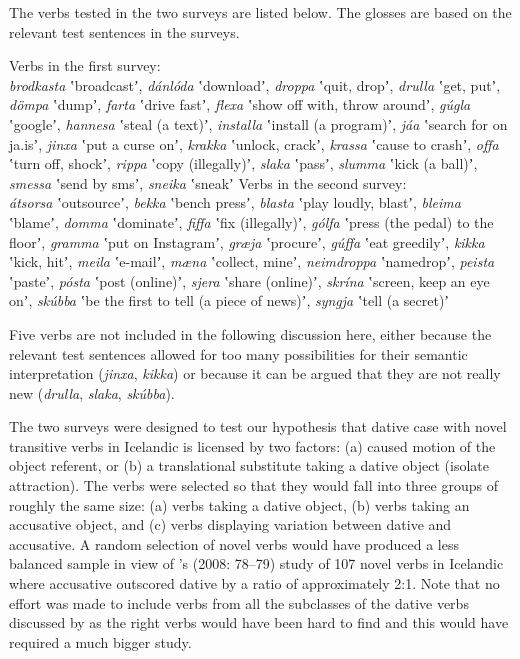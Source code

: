 \documentclass[output=paper,modfonts,nonflat,colorlinks,citecolor=brown]{langsci/langscibook}
\begin{document}
The verbs tested in the two surveys are listed below. The glosses are based on the relevant test sentences in the surveys.


\eanoraggedright
\eanoraggedright Verbs in the first survey: \\
\textit{brodkasta} ʽbroadcastʼ, \textit{dánlóda} ʽdownloadʼ, \textit{droppa} ʽquit, dropʼ, \textit{drulla} ʽget, putʼ, \textit{dömpa} ʽdumpʼ, \textit{farta} ʽdrive fastʼ, \textit{flexa} ʽshow off with, throw aroundʼ, \textit{gúgla} ʽgoogleʼ, \textit{hannesa} ʽsteal (a text)ʼ, \textit{installa} ʽinstall (a program)ʼ, \textit{jáa} ʽsearch for on ja.isʼ, \textit{jinxa} ʽput a curse onʼ, \textit{krakka} ʽunlock, crackʼ, \textit{krassa} ʽcause to crashʼ, \textit{offa} ʽturn off, shockʼ, \textit{rippa} ʽcopy (illegally)ʼ, \textit{slaka} ʽpassʼ, \textit{slumma} ʽkick (a ball)ʼ, \textit{smessa} ʽsend by smsʼ, \textit{sneika} ʽsneakʼ
\ex Verbs in the second survey: \\
\textit{átsorsa} ʽoutsourceʼ, \textit{bekka} ʽbench pressʼ, \textit{blasta} ʽplay loudly, blastʼ, \textit{bleima} ʽblameʼ, \textit{domma} ʽdominateʼ, \textit{fiffa} ʽfix (illegally)ʼ, \textit{gólfa} ʽpress (the pedal) to the floorʼ, \textit{gramma} ʽput on Instagramʼ, \textit{græja} ʽprocureʼ, \textit{gúffa} ʽeat greedilyʼ, \textit{kikka} ʽkick, hitʼ, \textit{meila} ʽe-mailʼ, \textit{mæna} ʽcollect, mineʼ, \textit{neimdroppa} ʽnamedropʼ, \textit{peista} ʽpasteʼ, \textit{pósta}  ʽpost (online)ʼ, \textit{sjera} ʽshare (online)ʼ, \textit{skrína}  ʽscreen, keep an eye onʼ, \textit{skúbba} ʽbe the first to tell (a piece of news)ʼ, \textit{syngja} ʽtell (a secret)ʼ\\
\z
\z

Five verbs are not included in the following discussion here, either because the relevant test sentences allowed for too many possibilities for their semantic interpretation (\textit{jinxa}, \textit{kikka}) or because it can be argued that they are not really new  (\textit{drulla}, \textit{slaka}, \textit{skúbba}).


The two surveys were designed to test our hypothesis that dative case with novel transitive verbs in Icelandic is licensed by two factors: (a) caused motion of the object referent, or (b) a translational substitute taking a dative object (isolate attraction). The verbs were selected so that they would fall into three groups of roughly the same size: (a) verbs taking a dative object, (b) verbs taking an accusative object, and (c) verbs displaying variation between dative and accusative. A random selection of novel verbs would have produced a less balanced sample in view of \citeauthor{Barðdal2008}’s (2008: 78--79) study of 107 novel verbs in Icelandic where accusative outscored dative by a ratio of approximately 2:1. Note that no effort was made to include verbs from all the subclasses of the dative verbs discussed by \citet{Maling2002} as the right verbs would have been hard to find and this would have required a much bigger study.
\end{document}
